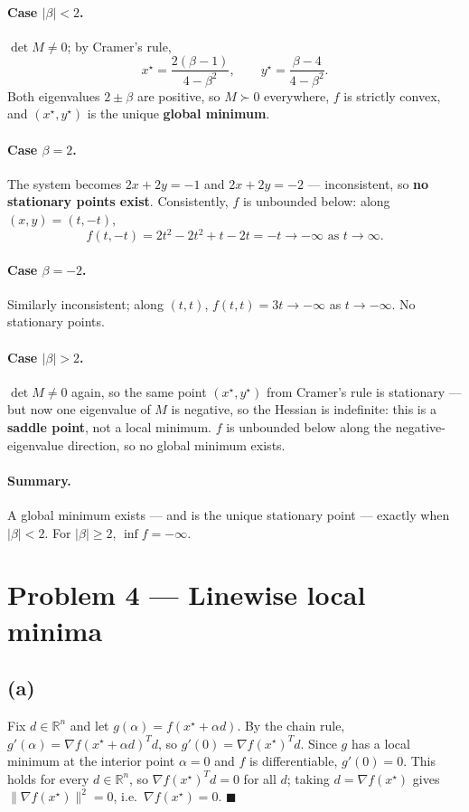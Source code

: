 \documentclass[11pt]{article}
\newcommand{\R}{\mathbb{R}}
\begin{document}
\paragraph{Case $|\beta|<2$.} $\det M \ne 0$; by Cramer's rule,
\[
x^\star = \frac{2(\beta-1)}{4-\beta^2}, \qquad y^\star = \frac{\beta-4}{4-\beta^2}.
\]
Both eigenvalues $2\pm\beta$ are positive, so $M\succ0$ everywhere, $f$ is strictly convex, and $(x^\star,y^\star)$ is the unique \textbf{global minimum}.

\paragraph{Case $\beta = 2$.} The system becomes $2x+2y=-1$ and $2x+2y=-2$ --- inconsistent, so \textbf{no stationary points exist}. Consistently, $f$ is unbounded below: along $(x,y)=(t,-t)$,
\[
f(t,-t) = 2t^2-2t^2+t-2t = -t \longrightarrow -\infty \text{ as } t\to\infty.
\]

\paragraph{Case $\beta=-2$.} Similarly inconsistent; along $(t,t)$, $f(t,t)=3t\to-\infty$ as $t\to-\infty$. No stationary points.

\paragraph{Case $|\beta|>2$.} $\det M\ne0$ again, so the same point $(x^\star,y^\star)$ from Cramer's rule is stationary --- but now one eigenvalue of $M$ is negative, so the Hessian is indefinite: this is a \textbf{saddle point}, not a local minimum. $f$ is unbounded below along the negative-eigenvalue direction, so no global minimum exists.

\paragraph{Summary.} A global minimum exists --- and is the unique stationary point --- exactly when $|\beta|<2$. For $|\beta|\ge2$, $\inf f = -\infty$.

\section*{Problem 4 --- Linewise local minima}

\subsection*{(a)}
Fix $d\in\R^n$ and let $g(\alpha) = f(x^\star+\alpha d)$. By the chain rule, $g'(\alpha)=\nabla f(x^\star+\alpha d)^Td$, so $g'(0)=\nabla f(x^\star)^Td$. Since $g$ has a local minimum at the interior point $\alpha=0$ and $f$ is differentiable, $g'(0)=0$. This holds for every $d\in\R^n$, so $\nabla f(x^\star)^Td=0$ for all $d$; taking $d=\nabla f(x^\star)$ gives $\|\nabla f(x^\star)\|^2=0$, i.e.\ $\nabla f(x^\star)=0$. $\blacksquare$
\end{document}
